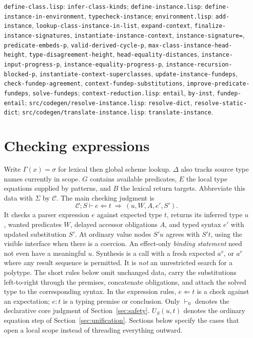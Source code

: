 \documentclass[11pt]{article}
\theoremstyle{definition}
\newcommand{\src}[1]{\nolinkurl{#1}}
\newcommand{\chk}{\mathrel{\Leftarrow}}
\begin{document}
\sources \src{define-class.lisp}: \src{infer-class-kinds};
\src{define-instance.lisp}: \src{define-instance-in-environment},
\src{typecheck-instance}; \src{environment.lisp}: \src{add-instance},
\src{lookup-class-instance-in-list}, \src{expand-context}, \src{finalize-instance-signatures},
\src{instantiate-instance-context}, \src{instance-signature=},
\src{predicate-embeds-p}, \src{valid-derived-cycle-p}, \src{max-class-instance-head-height},
\src{type-disagreement-height}, \src{head-equality-distances}, \src{instance-input-progress-p},
\src{instance-equality-progress-p}, \src{instance-recursion-blocked-p},
\src{instantiate-context-superclasses}, \src{update-instance-fundeps},
\src{check-fundep-agreement}, \src{context-fundep-substitutions}, \src{improve-predicate-fundeps},
\src{solve-fundeps}; \src{context-reduction.lisp}: \src{entail},
\src{by-inst}, \src{fundep-entail};
\src{src/codegen/resolve-instance.lisp}: \src{resolve-dict}, \src{resolve-static-dict};
\src{src/codegen/translate-instance.lisp}: \src{translate-instance}.

\section{Checking expressions}\label{sec:terms}

Write $\Gamma(x)=\sigma$ for lexical then global scheme lookup. $\Delta$
also tracks source type names currently in scope. $G$ contains available
predicates, $E$ the local type equations supplied by patterns, and $B$ the
lexical return targets. Abbreviate this data with $\Sigma$ by $\mathcal C$.
The main checking judgment is
\[
 \mathcal C;S\vdash e\chk t
      \ \Longrightarrow\ (u,W,A,e',S').
\]
It checks a parser expression $e$ against expected type $t$, returns its
inferred type $u$, wanted predicates $W$, delayed accessor obligations $A$,
and typed syntax $e'$ with updated substitution $S'$. At ordinary value
nodes $S'u$ agrees with $S't$, using the visible interface when there is a
coercion. An effect-only \emph{binding statement} need not even have a
meaningful $u$. Synthesis is a call with a fresh expected $a^v$, or $a^r$
where any result sequence is permitted. It is \emph{not} an unrestricted
search for a polytype. The short rules below omit unchanged data, carry the
substitutions left-to-right through the premises, concatenate obligations,
and attach the solved type to the corresponding syntax. In the expression
rules, $e\chk t$ is a check against an expectation; $e:t$ is a typing
premise or conclusion. Only $\vdash_0$ denotes the declarative core
judgment of Section~\ref{sec:safety}. $U_S(u,t)$ denotes
the ordinary equation step of Section~\ref{sec:unification}. Sections below
specify the cases that open a local scope instead of threading everything
outward.
\end{document}
